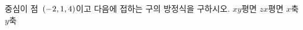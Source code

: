 중심이 점~$(-2{,}\mkern3mu\mathopen{}1{,}\mkern3mu\mathopen{}4)$이고 다음에 접하는 구의 방정식을 구하시오.
 $xy$평면
 $zx$평면
 $x$축
 $y$축
